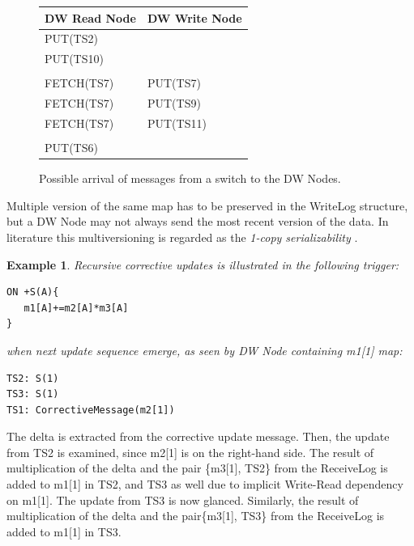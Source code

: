 \documentclass{sig-semester}
\newtheorem{example}[theorem]{Example}
\begin{document}
\begin{figure}
\begin{center}

\begin{tabular}{l|l}
DW Read Node      &     DW Write Node\\
\hline
PUT(TS2)   & \\
PUT(TS10)  & \\
           & \\
FETCH(TS7) & PUT(TS7)  \\
FETCH(TS7) & PUT(TS9)  \\
FETCH(TS7) & PUT(TS11)  \\
           & \\
PUT(TS6)   & \\   
\end{tabular}
\end{center}

\vspace{-3mm}
\caption{Possible arrival of messages from a switch to the DW Nodes.}
\label{fig:correct}
\vspace{-2mm}
\end{figure}

Multiple version of the same map has to be preserved in the WriteLog structure, but a DW Node may not always send the most recent version of the data. In literature this multiversioning is regarded as the \textit{1-copy serializability} \cite{Rachid08}.

\begin{example} \em
\label{ex:recursive}
Recursive corrective updates is illustrated in the following trigger:
\begin{verbatim}
ON +S(A){
   m1[A]+=m2[A]*m3[A]
}
\end{verbatim}
when next update sequence emerge, as seen by DW Node containing m1[1] map:
\begin{verbatim}
TS2: S(1)
TS3: S(1)
TS1: CorrectiveMessage(m2[1])
\end{verbatim}
\end{example}
The delta is extracted from the corrective update message. Then, the update from TS2 is examined, since m2[1] is on the right-hand side. The result of multiplication of the delta and the pair \{m3[1], TS2\} from the ReceiveLog is added to m1[1] in TS2, and TS3 as well due to implicit Write-Read dependency on m1[1]. The update from TS3 is now glanced. Similarly, the result of multiplication of the delta and the pair\{m3[1], TS3\} from the ReceiveLog is added to m1[1] in TS3.
\end{document}
